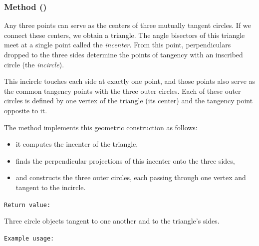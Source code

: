 \subsubsection{Method ()}
\label{ssub:method_triangle_three_tgt_c}

Any three points can serve as the centers of three mutually tangent circles.
If we connect these centers, we obtain a triangle.
The angle bisectors of this triangle meet at a single point called the \emph{incenter}.
From this point, perpendiculars dropped to the three sides determine the points of tangency with an inscribed circle (the \emph{incircle}).

\medskip
This incircle touches each side at exactly one point, and those points also serve as the common tangency points with the three outer circles.
Each of these outer circles is defined by one vertex of the triangle (its center) and the tangency point opposite to it.

\medskip
The method  implements this geometric construction as follows:
\begin{itemize}
  \item it computes the incenter of the triangle,
  \item finds the perpendicular projections of this incenter onto the three sides,
  \item and constructs the three outer circles, each passing through one vertex and tangent to the incircle.
\end{itemize}


\texttt{Return value: }

Three circle objects tangent to one another and to the triangle’s sides.


\texttt{Example usage: }

\begin{tkzexample}[latex=.45\textwidth]
\begin{center}
\end{center}
 \end{tkzexample}

